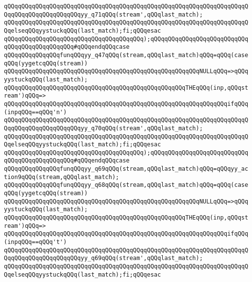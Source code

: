 \verb|qQQqqQQqqQQqqQQqqQQqqQQqqQQqqQQqqQQqqQQqqQQqqQQqqQQqqQQqqQQqqQQqqQQqqQQqqQQqqQQqqQQqqQQqqQQqyy_q71qQQq(stream',qQQqlast_match);|\newline
\verb|qQQqqQQqqQQqqQQqqQQqqQQqqQQqqQQqqQQqqQQqqQQqqQQqqQQqqQQqqQQqqQQqqQQqqQQqelseqQQqyystuckqQQq(last_match);fi;qQQqesac|\newline
\verb|qQQqqQQqqQQqqQQqqQQqqQQqqQQqqQQqqQQqqQQq);qQQqqQQqqQQqqQQqqQQqqQQqqQQqqQQqqQQqqQQqqQQqqQQq#qQQqendqQQqcase|\newline
\verb|qQQqqQQqqQQqqQQqfunqQQqyy_q47qQQq(stream,qQQqlast_match)qQQq=qQQq(caseqQQq(yygetcqQQq(stream))|\newline
\verb|qQQqqQQqqQQqqQQqqQQqqQQqqQQqqQQqqQQqqQQqqQQqqQQqqQQqqQQqNULLqQQq=>qQQqyystuckqQQq(last_match);|\newline
\verb|qQQqqQQqqQQqqQQqqQQqqQQqqQQqqQQqqQQqqQQqqQQqqQQqqQQqTHEqQQq(inp,qQQqstream')qQQq=>|\newline
\verb|qQQqqQQqqQQqqQQqqQQqqQQqqQQqqQQqqQQqqQQqqQQqqQQqqQQqqQQqqQQqqQQqifqQQq(inpqQQq==qQQq'n')|\newline
\verb|qQQqqQQqqQQqqQQqqQQqqQQqqQQqqQQqqQQqqQQqqQQqqQQqqQQqqQQqqQQqqQQqqQQqqQQqqQQqqQQqqQQqqQQqqQQqyy_q70qQQq(stream',qQQqlast_match);|\newline
\verb|qQQqqQQqqQQqqQQqqQQqqQQqqQQqqQQqqQQqqQQqqQQqqQQqqQQqqQQqqQQqqQQqqQQqqQQqelseqQQqyystuckqQQq(last_match);fi;qQQqesac|\newline
\verb|qQQqqQQqqQQqqQQqqQQqqQQqqQQqqQQqqQQqqQQq);qQQqqQQqqQQqqQQqqQQqqQQqqQQqqQQqqQQqqQQqqQQqqQQq#qQQqendqQQqcase|\newline
\verb|qQQqqQQqqQQqqQQqfunqQQqyy_q69qQQq(stream,qQQqlast_match)qQQq=qQQqyy_action9qQQq(stream,qQQqlast_match);|\newline
\verb|qQQqqQQqqQQqqQQqfunqQQqyy_q68qQQq(stream,qQQqlast_match)qQQq=qQQq(caseqQQq(yygetcqQQq(stream))|\newline
\verb|qQQqqQQqqQQqqQQqqQQqqQQqqQQqqQQqqQQqqQQqqQQqqQQqqQQqqQQqNULLqQQq=>qQQqyystuckqQQq(last_match);|\newline
\verb|qQQqqQQqqQQqqQQqqQQqqQQqqQQqqQQqqQQqqQQqqQQqqQQqqQQqTHEqQQq(inp,qQQqstream')qQQq=>|\newline
\verb|qQQqqQQqqQQqqQQqqQQqqQQqqQQqqQQqqQQqqQQqqQQqqQQqqQQqqQQqqQQqqQQqifqQQq(inpqQQq==qQQq't')|\newline
\verb|qQQqqQQqqQQqqQQqqQQqqQQqqQQqqQQqqQQqqQQqqQQqqQQqqQQqqQQqqQQqqQQqqQQqqQQqqQQqqQQqqQQqqQQqqQQqyy_q69qQQq(stream',qQQqlast_match);|\newline
\verb|qQQqqQQqqQQqqQQqqQQqqQQqqQQqqQQqqQQqqQQqqQQqqQQqqQQqqQQqqQQqqQQqqQQqqQQqelseqQQqyystuckqQQq(last_match);fi;qQQqesac|\newline
